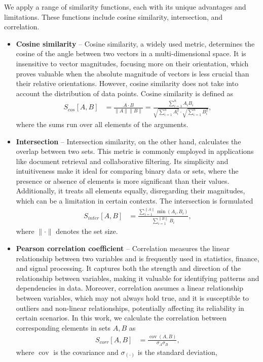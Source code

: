 We apply a range of similarity functions, each with its unique advantages and limitations. These functions include cosine similarity, intersection, and correlation.
\begin{itemize}
  \item \textbf{Cosine similarity} -- Cosine similarity, a widely used metric, determines the cosine of the angle
  between two vectors in a multi-dimensional space. It is insensitive to vector magnitudes, focusing more on their
  orientation, which proves valuable when the absolute magnitude of vectors is less crucial than their relative
  orientations. However, cosine similarity does not take into account the distribution of data points. Cosine
  similarity is defined as
  \begin{align}
    S_{cos} [A,B] &= \frac{A\cdot B}{\|A\|\|B\|} = \frac{\sum_{i=1}^nA_iB_i}{\sqrt{\sum_{i=1}^nA_i^2} \cdot \sqrt{\sum_{i
    =1}^n B_i^2}},
  \end{align}
  where the sums run over all elements of the arguments.
  \item \textbf{Intersection} -- Intersection similarity, on the other hand, calculates the overlap between two sets. This metric is commonly employed in applications like document retrieval and collaborative filtering. Its
  simplicity and intuitiveness make it ideal for comparing binary data or sets, where the presence or absence of
  elements is more significant than their values. Additionally, it treats all elements equally, disregarding their
  magnitudes, which can be a limitation in certain contexts. The intersection is formulated
    \begin{align}
      S_{inter}[A,B] &= \frac{\sum_{i=1}^{\|A\|} \min(A_i, B_i) }{\sum_{i=1}^{\|B\|} B_i},
    \end{align}
    where $\|\cdot\|$ denotes the set size.
  \item \textbf{Pearson correlation coefficient} -- Correlation measures the linear relationship between two
  variables and is frequently used in statistics, finance, and signal processing. It captures both the strength and
  direction of the relationship between variables, making it valuable for identifying patterns and dependencies in
  data. Moreover, correlation assumes a linear relationship between variables, which may not always hold true, and it
  is susceptible to outliers and non-linear relationships, potentially  affecting its reliability in certain scenarios. In this work, we calculate the correlation between corresponding elements in sets $A, B$ as
    \begin{align}
      S_{corr}[A,B] &= \frac{\operatorname{cov}(A,B)}{\sigma_A \sigma_B},
    \end{align}
    where $\operatorname{cov}$ is the covariance and $\sigma_{(\cdot)}$ is the standard deviation,
\end{itemize}

